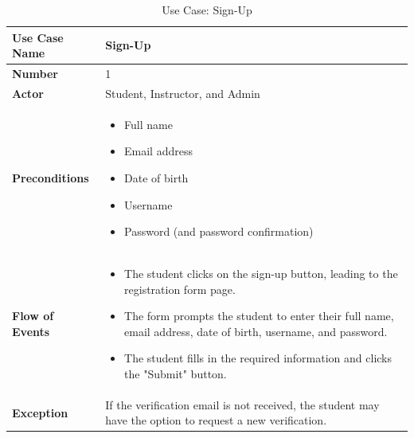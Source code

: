 \begin{table}[h!]
    \centering
    \caption{Use Case: Sign-Up}
    \bgroup
    \def\arraystretch{1.5}%
    \begin{tabular}{|m{4cm}|m{11cm}|}
        \hline
        \textbf{Use Case Name} & Sign-Up \\
        \hline
        \textbf{Number} & 1 \\
        \hline
        \textbf{Actor} & Student, Instructor, and Admin \\
        \hline
        \textbf{Preconditions} & 
        \begin{itemize}[noitemsep,topsep=0pt] %
            \item Full name
            \item Email address
            \item Date of birth
            \item Username
            \item Password (and password confirmation)
        \end{itemize} \\
        \hline
        \textbf{Flow of Events} & 
        \begin{itemize}[noitemsep,topsep=0pt]
            \item The student clicks on the sign-up button, leading to the registration form page.
            \item The form prompts the student to enter their full name, email address, date of birth, username, and password.
            \item The student fills in the required information and clicks the "Submit" button.
        \end{itemize} \\
        \hline
        \textbf{Exception} & 
        If the verification email is not received, the student may have the option to request a new verification. \\
        \hline
    \end{tabular}
    \egroup
\end{table}

\newpage

